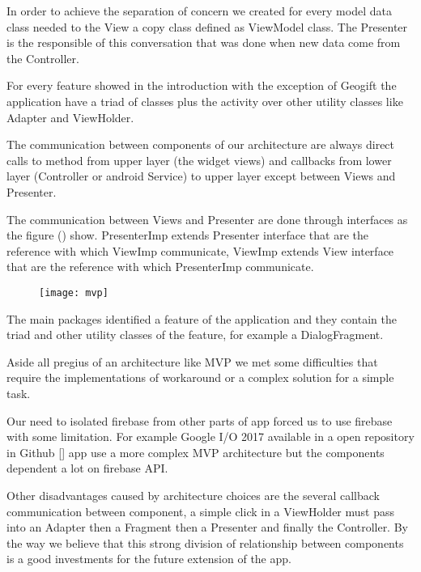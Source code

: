 In order to achieve the separation of concern we created for every model data class needed to the View a copy class defined as ViewModel class. The Presenter is the responsible of this conversation that was done when new data come from the Controller. 

For every feature showed in the introduction with the exception of Geogift the application have a triad of classes plus the activity over other utility classes like Adapter and ViewHolder. 

The communication between components of our architecture are always direct calls to method from upper layer (the widget views) and callbacks from lower layer (Controller or android Service) to upper layer except between Views and Presenter.

The communication between Views and Presenter are done through interfaces as the figure () show. PresenterImp extends Presenter interface that are the reference with which ViewImp communicate, ViewImp extends View interface that are the reference with which PresenterImp communicate.

\begin{figure}[h]
	\texttt{[image: mvp]}
\end{figure}

The main packages identified a feature of the application and they contain the triad and other utility classes of the feature, for example a DialogFragment.

Aside all pregius of an architecture like MVP we met some difficulties that require the implementations of workaround or a complex solution for a simple task. 

Our need to isolated firebase from other parts of app forced us to use firebase with some limitation. For example Google I/O 2017 available in a open repository in Github [] app use a more complex MVP architecture but the components dependent a lot on firebase API.

Other disadvantages caused by architecture choices are the several callback communication between component, a simple click in a ViewHolder must pass into an Adapter then a Fragment then a Presenter and finally the Controller. By the way we believe that this strong division of relationship between components is a good investments for the future extension of the app.

